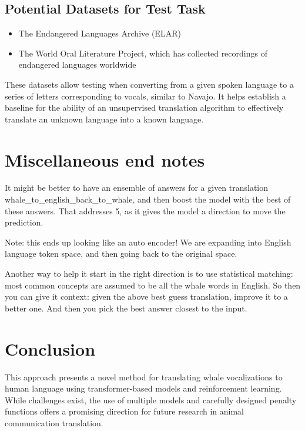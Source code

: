 \documentclass{article}
\begin{document}
\subsection{Potential Datasets for Test Task}
\begin{itemize}
    \item The Endangered Languages Archive (ELAR)
    \item The World Oral Literature Project, which has collected recordings of endangered languages worldwide
\end{itemize}

These datasets allow testing when converting from a given spoken language to a series of letters corresponding to vocals, similar to Navajo. It helps establish a baseline for the ability of an unsupervised translation algorithm to effectively translate an unknown language into a known language.

\section{Miscellaneous end notes}

It might be better to have an ensemble of answers for a given translation whale\_to\_english\_back\_to\_whale, and then boost the model with the best of these answers. That addresses 5, as it gives the model a direction to move the prediction.

Note: this ends up looking like an auto encoder! We are expanding into English language token space, and then going back to the original space.


Another way to help it start in the right direction is to use statistical matching: most common concepts are assumed to be all the whale words in English. So then you can give it context: given the above best guess translation, improve it to a better one. And then you pick the best answer closest to the input.

\section{Conclusion}
This approach presents a novel method for translating whale vocalizations to human language using transformer-based models and reinforcement learning. While challenges exist, the use of multiple models and carefully designed penalty functions offers a promising direction for future research in animal communication translation.
\end{document}
